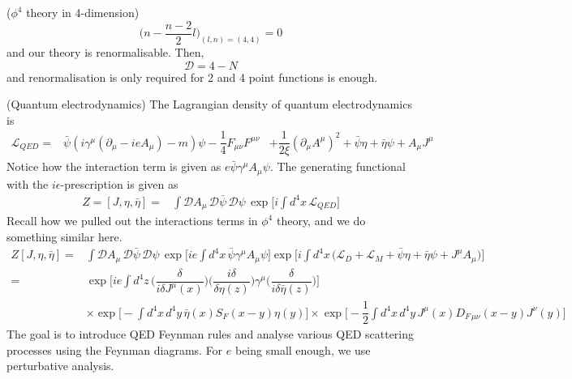 \vspace{2ex}
\begin{ex}
($\phi ^{4}$ theory in 4-dimension)
\[\Big(n-\dfrac{n-2}{2}l\Big)_{(l,n)=(4,4)}=0\]
and our theory is renormalisable. Then,
\[\mathcal{D}=4-N\]
and renormalisation is only required for 2 and 4 point functions is enough. 
\end{ex}
\vspace{2ex}
\begin{defi}
(Quantum electrodynamics) The Lagrangian density of quantum electrodynamics is
\[\begin{align*}
\mathcal{L}_{QED}=&\bar{\psi }(i\gamma ^{\mu }(\partial_{\mu }-ieA_{\mu })-m)\psi -\dfrac{1}{4}F_{\mu \nu }F^{\mu \nu }&+\dfrac{1}{2\xi }(\partial _{\mu }A^{\mu })^2+\bar{\psi }\eta +\bar{\eta }\psi +A_{\mu }J^{\mu } 
\end{align*}\]
Notice how the interaction term is given as $e\bar{\psi }\gamma ^{\mu }A_{\mu }\psi $. The generating functional with the $i\epsilon $-prescription is given as
\[\begin{align*}
Z=[J,\eta ,\bar{\eta }]=&\int \mathcal{D}A_{\mu }\,\mathcal{D}\bar{\psi }\,\mathcal{D}\psi\,\exp \Big[i\int d^{4}x\,\mathcal{L}_{QED}\Big]
\end{align*}\]
Recall how we pulled out the interactions terms in $\phi ^{4}$ theory, and we do something similar here. 
\[\begin{align*}
Z[J,\eta ,\bar{\eta}]=&\int \mathcal{D}A_{\mu }\,\mathcal{D}\bar{\psi }\,\mathcal{D}\psi \,\exp \Big[ie\int d^{4}x\,\bar{\psi }\gamma ^{\mu }A_{\mu }\psi \Big]\exp \Big[i\int d^{4}x\,\Big(\mathcal{L}_{D}+\mathcal{L}_{M}+\bar{\psi }\eta +\bar{\eta }\psi +J^{\mu }A_{\mu }\Big)\Big]\\
=&\exp \Big[ie\int d^{4}z\,\Big(\dfrac{\delta }{i\delta J^{\mu }(x)}\Big)\Big(\dfrac{i\delta }{\delta \eta (z)}\Big)\gamma ^{\mu }\Big(\dfrac{\delta }{i\delta \bar{\eta }(z)}\Big)\Big]\\&\times \exp \Big[-\int d^{4}x\,d^{4}y\,\bar{\eta }(x)S_{F}(x-y)\eta (y)\Big]\times \exp \Big[-\dfrac{1}{2}\int d^{4}x\,d^{4}y\,J^{\mu }(x)D_{F\,\mu \nu }(x-y)J^{\nu }(y)\Big]
\end{align*}\]
The goal is to introduce QED Feynman rules and analyse various QED scattering processes using the Feynman diagrams. For $e$ being small enough, we use perturbative analysis. 
\end{defi}
\vspace{2ex}
